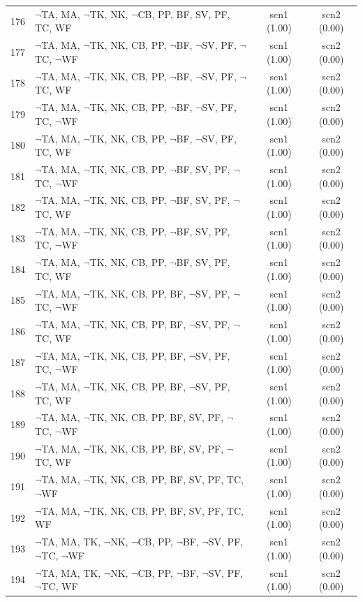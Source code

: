 \documentclass[12pt]{article}
\begin{document}
\begin{longtable}{|l|l|c|c|}
176 & $\neg$TA, MA, $\neg$TK, NK, $\neg$CB, PP, BF, SV, PF, TC, WF & scn1 (1.00) & scn2 (0.00)\\
177 & $\neg$TA, MA, $\neg$TK, NK, CB, PP, $\neg$BF, $\neg$SV, PF, $\neg$TC, $\neg$WF & scn1 (1.00) & scn2 (0.00)\\
178 & $\neg$TA, MA, $\neg$TK, NK, CB, PP, $\neg$BF, $\neg$SV, PF, $\neg$TC, WF & scn1 (1.00) & scn2 (0.00)\\
179 & $\neg$TA, MA, $\neg$TK, NK, CB, PP, $\neg$BF, $\neg$SV, PF, TC, $\neg$WF & scn1 (1.00) & scn2 (0.00)\\
180 & $\neg$TA, MA, $\neg$TK, NK, CB, PP, $\neg$BF, $\neg$SV, PF, TC, WF & scn1 (1.00) & scn2 (0.00)\\
181 & $\neg$TA, MA, $\neg$TK, NK, CB, PP, $\neg$BF, SV, PF, $\neg$TC, $\neg$WF & scn1 (1.00) & scn2 (0.00)\\
182 & $\neg$TA, MA, $\neg$TK, NK, CB, PP, $\neg$BF, SV, PF, $\neg$TC, WF & scn1 (1.00) & scn2 (0.00)\\
183 & $\neg$TA, MA, $\neg$TK, NK, CB, PP, $\neg$BF, SV, PF, TC, $\neg$WF & scn1 (1.00) & scn2 (0.00)\\
184 & $\neg$TA, MA, $\neg$TK, NK, CB, PP, $\neg$BF, SV, PF, TC, WF & scn1 (1.00) & scn2 (0.00)\\
185 & $\neg$TA, MA, $\neg$TK, NK, CB, PP, BF, $\neg$SV, PF, $\neg$TC, $\neg$WF & scn1 (1.00) & scn2 (0.00)\\
186 & $\neg$TA, MA, $\neg$TK, NK, CB, PP, BF, $\neg$SV, PF, $\neg$TC, WF & scn1 (1.00) & scn2 (0.00)\\
187 & $\neg$TA, MA, $\neg$TK, NK, CB, PP, BF, $\neg$SV, PF, TC, $\neg$WF & scn1 (1.00) & scn2 (0.00)\\
188 & $\neg$TA, MA, $\neg$TK, NK, CB, PP, BF, $\neg$SV, PF, TC, WF & scn1 (1.00) & scn2 (0.00)\\
189 & $\neg$TA, MA, $\neg$TK, NK, CB, PP, BF, SV, PF, $\neg$TC, $\neg$WF & scn1 (1.00) & scn2 (0.00)\\
190 & $\neg$TA, MA, $\neg$TK, NK, CB, PP, BF, SV, PF, $\neg$TC, WF & scn1 (1.00) & scn2 (0.00)\\
191 & $\neg$TA, MA, $\neg$TK, NK, CB, PP, BF, SV, PF, TC, $\neg$WF & scn1 (1.00) & scn2 (0.00)\\
192 & $\neg$TA, MA, $\neg$TK, NK, CB, PP, BF, SV, PF, TC, WF & scn1 (1.00) & scn2 (0.00)\\
193 & $\neg$TA, MA, TK, $\neg$NK, $\neg$CB, PP, $\neg$BF, $\neg$SV, PF, $\neg$TC, $\neg$WF & scn1 (1.00) & scn2 (0.00)\\
194 & $\neg$TA, MA, TK, $\neg$NK, $\neg$CB, PP, $\neg$BF, $\neg$SV, PF, $\neg$TC, WF & scn1 (1.00) & scn2 (0.00)\\

\end{longtable}
\end{document}
